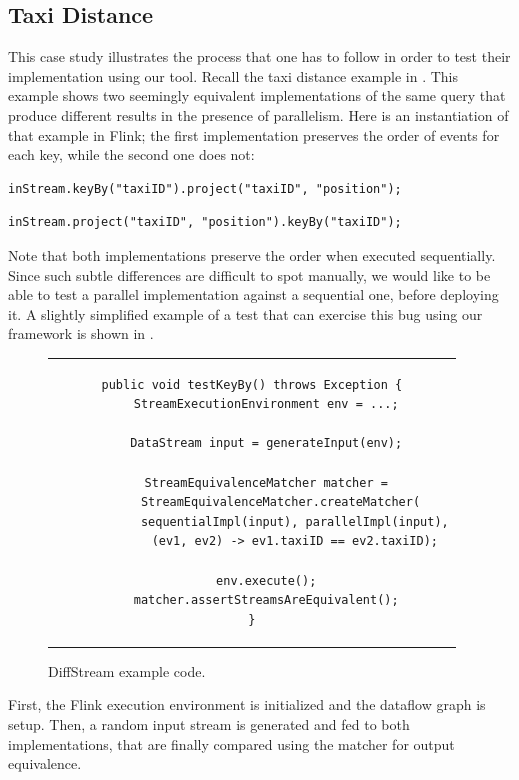 \subsection{Taxi Distance}
\label{diffstream:ssec:evaluation-keyby}

This case study illustrates the process that one has to follow in
order to test their implementation using our tool. Recall the taxi
distance example in . This example
shows two seemingly equivalent implementations of the same query that
produce different results in the presence of parallelism.  Here is an
instantiation of that example in Flink; the first implementation
preserves the order of events for each key, while the second one does
not:

\medskip

\begin{lstlisting}[basicstyle=\ttfamily\small,frame=none]
  inStream.keyBy("taxiID").project("taxiID", "position");
\end{lstlisting}
\begin{lstlisting}[basicstyle=\ttfamily\small,frame=none]
  inStream.project("taxiID", "position").keyBy("taxiID");
\end{lstlisting}

\medskip

Note that both implementations preserve the order when executed
sequentially. Since such subtle differences are difficult to spot
manually, we would like to be able to test a parallel implementation
against a sequential one, before deploying it. A slightly simplified
example of a test that can exercise this bug using our framework is
shown in .
\begin{figure}[tb]
    \centering
\begin{tabular}{c}
\begin{lstlisting}[linewidth=12cm,basicstyle=\ttfamily\normalsize]
public void testKeyBy() throws Exception {
    StreamExecutionEnvironment env = ...;

    DataStream input = generateInput(env);

    StreamEquivalenceMatcher matcher =
        StreamEquivalenceMatcher.createMatcher(
            sequentialImpl(input), parallelImpl(input),
            (ev1, ev2) -> ev1.taxiID == ev2.taxiID);

    env.execute();
    matcher.assertStreamsAreEquivalent();
}
\end{lstlisting}
\end{tabular}
    \caption{DiffStream example code.}
    \label{diffstream:fig:keybytest}
\end{figure}{}
%
First, the Flink execution environment is initialized and the dataflow
graph is setup. Then, a random input stream is generated and fed to
both implementations, that are finally compared using the matcher for
output equivalence.

